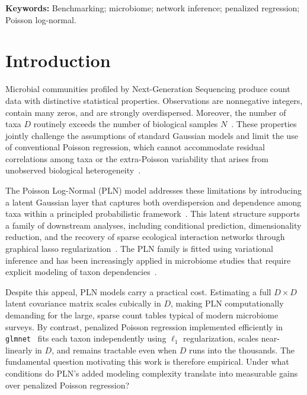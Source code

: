 \documentclass[11pt]{article}
\begin{document}
\noindent\textbf{Keywords:} Benchmarking; microbiome; network inference; penalized regression; Poisson log-normal.

\section{Introduction}
Microbial communities profiled by Next-Generation Sequencing produce count data with distinctive statistical properties.
Observations are nonnegative integers, contain many zeros, and are strongly overdispersed.   
Moreover, the number of taxa $D$ routinely exceeds the number of biological samples $N$~\citep{Kodikara2022}.
These properties jointly challenge the assumptions of standard Gaussian models and limit the use of conventional Poisson regression, which cannot accommodate residual correlations among taxa or the extra-Poisson variability that arises from unobserved biological heterogeneity~\citep{mcmurdie2014waste, Chiquet2021}.

The Poisson Log-Normal (PLN) model addresses these limitations by introducing a latent Gaussian layer that captures both overdispersion and dependence among taxa within a principled probabilistic framework~\citep{aitchison1989multivariate, Chiquet2021}.
This latent structure supports a family of downstream analyses, including conditional prediction, dimensionality reduction, and the recovery of sparse ecological interaction networks through graphical lasso regularization~\citep{chiquet2019variational}.
The PLN family is fitted using variational inference and has been increasingly applied in microbiome studies that require explicit modeling of taxon dependencies~\citep{Chiquet2021, SUBEDI20251255}.

Despite this appeal, PLN models carry a practical cost.
Estimating a full $D \times D$ latent covariance matrix scales cubically in $D$, making PLN computationally demanding for the large, sparse count tables typical of modern microbiome surveys.
By contrast, penalized Poisson regression implemented efficiently in \texttt{glmnet}~\citep{Friedman2010} fits each taxon independently using $\ell_1$ regularization, scales near-linearly in $D$, and remains tractable even when $D$ runs into the thousands.
The fundamental question motivating this work is therefore empirical.
Under what conditions do PLN's added modeling complexity translate into measurable gains over penalized Poisson regression?
\end{document}
